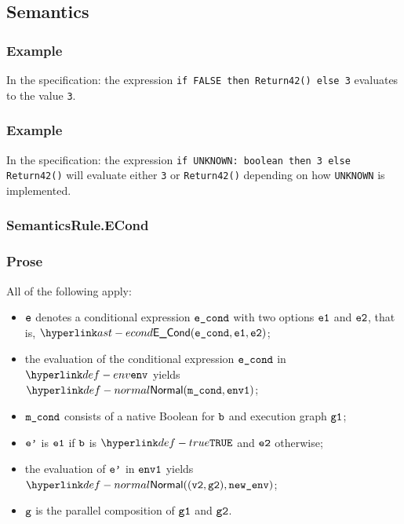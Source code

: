 \subsection{Semantics}
\subsubsection{Example}
In the specification:
the expression \texttt{if FALSE then Return42() else 3} evaluates to the value \texttt{3}.

\subsubsection{Example}
In the specification:
the expression \texttt{if UNKNOWN: boolean then 3 else Return42()} will
evaluate either \texttt{3} or \texttt{Return42()} depending on how
\texttt{UNKNOWN} is implemented.

\subsubsection{SemanticsRule.ECond \label{sec:SemanticsRule.ECond}}
\subsubsection{Prose}
All of the following apply:
\begin{itemize}
  \item $\texttt{e}$ denotes a conditional expression $\texttt{e\_cond}$ with two options $\texttt{e1}$ and $\texttt{e2}$,
        that is, $\ECond(\econd, \veone, \vetwo)$;
  \item the evaluation of the conditional expression $\texttt{e\_cond}$ in $\env$ yields \\
        $\Normal(\mcond, \envone)$\ProseOrAbnormal;
  \item $\texttt{m\_cond}$ consists of a native Boolean for $\texttt{b}$ and execution graph $\texttt{g1}$;
  \item $\texttt{e'}$ is $\texttt{e1}$ if $\texttt{b}$ is $\True$ and $\texttt{e2}$ otherwise;
  \item the evaluation of $\texttt{e'}$ in $\texttt{env1}$ yields $\Normal((\vvtwo, \vgtwo), \newenv)$\ProseOrAbnormal;
  \item $\texttt{g}$ is the parallel composition of $\texttt{g1}$ and $\texttt{g2}$.
\end{itemize}
